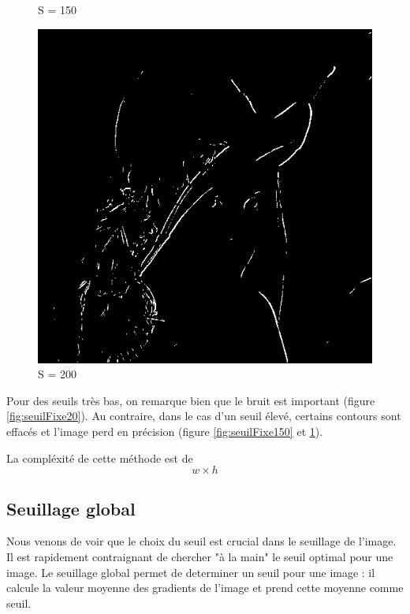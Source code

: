 \documentclass[11pt]{article}
\begin{document}
\begin{figure}[H]
\begin{minipage}[c]{.30\linewidth}
			\caption{S = 150}
			\label{fig:seuilFixe150}
		\end{minipage} \hfill
		\begin{minipage}[c]{.30\linewidth}
			\centering
			\includegraphics[scale=0.15]{Image/seuilFixe200.png}
			\caption{S = 200}
			\label{fig:seuilFixe200}
		\end{minipage}
	\end{figure}

	Pour des seuils très bas, on  remarque bien que le bruit est important (figure \ref{fig:seuilFixe20}).
	Au contraire, dans le cas d'un seuil élevé, certains contours sont effacés et l'image perd en précision (figure \ref{fig:seuilFixe150} et \ref{fig:seuilFixe200}).

	La compléxité de cette méthode est de \[w \times h\]

	\subsection{Seuillage global}

	Nous venons de voir que le choix du seuil est crucial dans le seuillage de l'image. 
	Il est rapidement contraignant de chercher "à la main" le seuil optimal pour une image.
	Le seuillage global permet de determiner un seuil pour une image : il calcule la valeur moyenne des gradients de l'image et 
	prend cette moyenne comme seuil.
\end{document}
